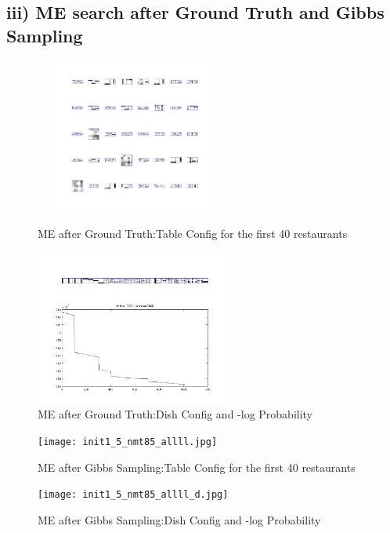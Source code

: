 \documentclass{article}
\begin{document}
\begin{spacing}{1.1}
\subsection{iii) ME search after Ground Truth and Gibbs Sampling}
\begin{figure}[h] 
  \begin{minipage}[b]{0.5\textwidth} 
    \centering 
    \includegraphics[width=2.5in,height=2in]{g_t_me1.jpg} 
    \caption{ME after Ground Truth:Table Config for the first 40 restaurants}
    \label{fig:by:table} 
  \end{minipage}%
  \begin{minipage}[b]{0.5\textwidth} 
    \centering 
    \includegraphics[width=2.5in,height=2in]{g_t_me1d.jpg} 
    \caption{ME after Ground Truth:Dish Config and -log Probability}
    \label{fig:by:table}  
   \end{minipage}%
\end{figure}
\begin{figure}[h] 
  \begin{minipage}[b]{0.5\textwidth} 
    \centering 
    \texttt{[image: init1\_5\_nmt85\_allll.jpg]} 
    \caption{ME after Gibbs Sampling:Table Config for the first 40 restaurants}
    \label{fig:by:table} 
  \end{minipage}%
  \begin{minipage}[b]{0.5\textwidth} 
    \centering 
    \texttt{[image: init1\_5\_nmt85\_allll\_d.jpg]} 
    \caption{ME after Gibbs Sampling:Dish Config and -log Probability}
    \label{fig:by:table}  
   \end{minipage}%
\end{figure}


\end{spacing}
\end{document}
